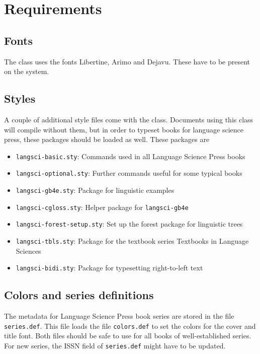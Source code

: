\documentclass[modfonts,output=guidelines]{langscibook}
\begin{document}
\chapter{Requirements}
\section{Fonts}
The class uses the fonts Libertine, Arimo and Dejavu. These have to be present on the system. 

\section{Styles}
A couple of additional style files come with the class. Documents using this class will compile without them, but in order to typeset books for language science press, these packages should be loaded as well. These packages are

\begin{itemize}
 \item \texttt{langsci-basic.sty}: Commands used in all Language Science Press books
 \item \texttt{langsci-optional.sty}: Further commands useful for some typical books
 \item \texttt{langsci-gb4e.sty}: Package for linguistic examples
 \item \texttt{langsci-cgloss.sty}: Helper package for \texttt{langsci-gb4e}
 \item \texttt{langsci-forest-setup.sty}: Set up the forest package for linguistic trees
 \item \texttt{langsci-tbls.sty}: Package for the textbook series Textbooks in Language Sciences
 \item \texttt{langsci-bidi.sty}: Package for typesetting right-to-left text
\end{itemize}

\section{Colors and series definitions}
The metadata for Language Science Press book series are stored in the file \texttt{series.def}. This file loads the file \texttt{colors.def} to set the colors for the cover and title font. Both files should be safe to use for all books of well-established series. For new series, the ISSN field of \texttt{series.def} might have to be updated. 
\end{document}

